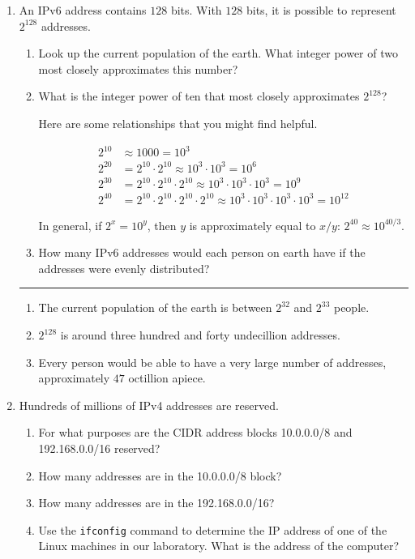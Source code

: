 \documentclass[twoside]{article}
\newenvironment{answer}
  {\vspace*{0.2cm} \rule{12cm}{0.04cm} \vspace*{0.2cm}}
  {\vspace*{0.2cm}}
\begin{document}
\begin{enumerate}
\begin{answer}
    \end{answer}

  \item An IPv6 address contains $128$ bits. With $128$ bits, it
    is possible to represent $2^{128}$ addresses.
  \begin{enumerate}
    \item Look up the current population of the earth. What integer
      power of two most closely approximates this number?
    \item What is the integer power of ten that most closely
      approximates $2^{128}$?

      Here are some relationships that you might find helpful.

      \begin{align*}
        2^{10} & \approx 1000 = 10^3 \\
        2^{20} & = 2^{10} \cdot 2^{10} \approx 10^3 \cdot 10^3 = 10^6 \\
        2^{30} & = 2^{10} \cdot 2^{10} \cdot 2^{10} \approx 10^3 \cdot 10^3 \cdot 10^3 = 10^9 \\
        2^{40} & = 2^{10} \cdot 2^{10} \cdot 2^{10} \cdot 2^{10} \approx
            10^3 \cdot 10^3 \cdot 10^3 \cdot 10^3 = 10^{12}
        \end{align*}

      In general, if $2^x = 10^y$, then $y$ is approximately equal to $x/y$: $2^{40} \approx 10^{40/3}$.
      
    \item How many IPv6 addresses would each person on earth have if the addresses
      were evenly distributed?
    \end{enumerate}

  \begin{answer}

  \begin{enumerate}
    \item The current population of the earth is between $2^{32}$ and $2^{33}$ people.
    \item $2^{128}$ is around three hundred and forty undecillion addresses.
    \item Every person would be able to have a very large number of addresses,
      approximately $47$ octillion apiece.
    \end{enumerate}

    \end{answer}

  \item Hundreds of millions of IPv4 addresses are reserved.
  \begin{enumerate}
    \item For what purposes are the CIDR address blocks 10.0.0.0/8 and 192.168.0.0/16 reserved?
    \item How many addresses are in the 10.0.0.0/8 block?
    \item How many addresses are in the 192.168.0.0/16?
    \item Use the \verb+ifconfig+ command to determine the IP address of
      one of the Linux machines in our laboratory. What is the address of the computer?
    \end{enumerate}


\end{enumerate}
\end{document}
